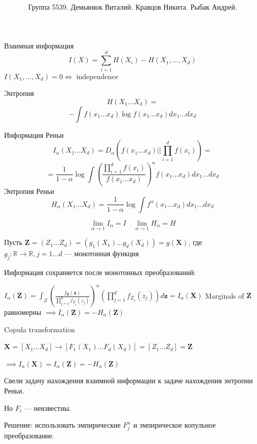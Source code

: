 \documentclass[14pt]{beamer}
\title{
}
\institute{Университет ИТМО}
\author{ Группа 5539. 
Демьянюк Виталий.
Кравцов Никита.
Рыбак Андрей.}
\date{}
\begin{document}
{
\fontsize{14pt}{14pt}\selectfont
{}
\begin{frame}
    \maketitle
\end{frame}
}

\begin{frame}
{Взаимная информация}
$$
I(X) = \sum\limits_{i=1}^{d} H(X_i) - H(X_1, \dots, X_d) 
$$
$
I(X_1, \dots, X_d) = 0  \iff $ independence

Энтропия
$$
H(X_1 \dots X_d) =
$$
$$
- \int f (x_1 \dots x_d) \log f (x_1 \dots x_d) d x_1 \dots d x_d
$$
\end{frame}
\begin{frame}
Информация Реньи
$$
I_{\alpha}  (X_1 \dots X_d)  = D_{\alpha}
\left ( f(x_1 \dots x_d) || \prod\limits_{i=1}^d f(x_i) \right ) =
$$
$$
= \frac{1}{1-\alpha} \log \int
\left ( \frac {\prod_{i=1}^d f(x_i)} {f(x_1 \dots x_d)} \right )^{\alpha}
f(x_1 \dots x_d) d x_1 \dots d x_d
$$
Энтропия Реньи
$$
H_{\alpha}  (X_1 \dots X_d) = \frac{1}{1-\alpha} \log \int
f^{\alpha} (x_1 \dots x_d)  dx_1 \dots dx_d
$$

$$
\lim_{\alpha \to 1} I_{\alpha} = I \quad \lim_{\alpha \to 1} H_{\alpha} = H
$$
\end{frame}

\begin{frame}
    Пусть $ \mathbf Z = (Z_1 \dots Z_d) = (g_1(X_1) \dots g_d(X_d)) = g(\mathbf X)  $, где 
    $ g_j : \mathbb R \to \mathbb R, j = 1 \dots d $ — монотонная функция

    Информация сохраняется после монотонных преобразований:

    $I_\alpha(\mathbf Z) = \int_{Z} \left ( \frac{f_{\mathbf Z}(\mathbf z)}{\prod_{j=1}^d f_{Z_j}(z_j)} \right )^\alpha
    \left ( \prod\limits_{j=1}^d f_{Z_j}(z_j) \right ) d {\mathbf z} = I_\alpha (\mathbf X)
    $
    Marginals of $\mathbf Z$ равномерны  $\implies I_\alpha (\mathbf Z) = -H_\alpha (\mathbf Z) $
\end{frame}

\begin{frame}
Copula transformation

$\mathbf X = [X_1 \dots X_d] \to [F_1(X_1) \dots F_d(X_d)] = [Z_1 \dots Z_d] = \mathbf Z$

$\implies I_\alpha (\mathbf X) = I_\alpha (\mathbf Z) = -H_\alpha (\mathbf Z) $

Свели задачу нахождения взаимной информации к задаче нахождения энтропии Реньи.

Но $F_i$ — неизвестны.

\pause

Решение: использовать эмпирические $F^n_j $ и эмпирическое копульное
преобразование.
\end{frame}
\end{document}
